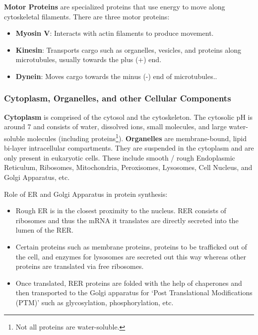 \documentclass[12pt]{article}
\begin{document}
\textbf{Motor Proteins} are specialized proteins that use energy to move along
cytoskeletal filaments. There are three motor proteins:
\begin{itemize}
    \item \textbf{Myosin V}: Interacts with actin filaments to produce movement.
    \item \textbf{Kinesin}: Transports cargo such as organelles, vesicles, and proteins along microtubules, usually towards the plus (+) end.
    \item \textbf{Dynein}: Moves cargo towards the minus (-) end of microtubules..
\end{itemize}

\subsubsection{Cytoplasm, Organelles, and other Cellular Components}
\textbf{Cytoplasm} is comprised of the cytosol and the cytoskeleton. The cytosolic pH is around 7 and consists of water, dissolved ions, small molecules, and large water-soluble molecules (including proteins\footnote{Not all proteins are water-soluble.}).
\textbf{Organelles} are membrane-bound, lipid bi-layer intracellular compartments. They are suspended in the cytoplasm and are only present in eukaryotic cells. These include smooth / rough Endoplasmic Reticulum, Ribosomes, Mitochondria, Peroxisomes, Lysosomes, Cell Nucleus, and Golgi Apparatus, etc.

\vspace{1em}
\noindent
Role of ER and Golgi Apparatus in protein synthesis:
\begin{itemize}
    \item Rough ER is in the closest proximity to the nucleus. RER consists of ribosomes
          and thus the mRNA it translates are directly secreted into the lumen of the
          RER.
    \item Certain proteins such as membrane proteins, proteins to be trafficked out of
          the cell, and enzymes for lysosomes are secreted out this way whereas other
          proteins are translated via free ribosomes.
    \item Once translated, RER proteins are folded with the help of chaperones and then
          transported to the Golgi apparatus for `Post Translational Modifications (PTM)'
          such as glycosylation, phosphorylation, etc.
\end{itemize}
\end{document}
